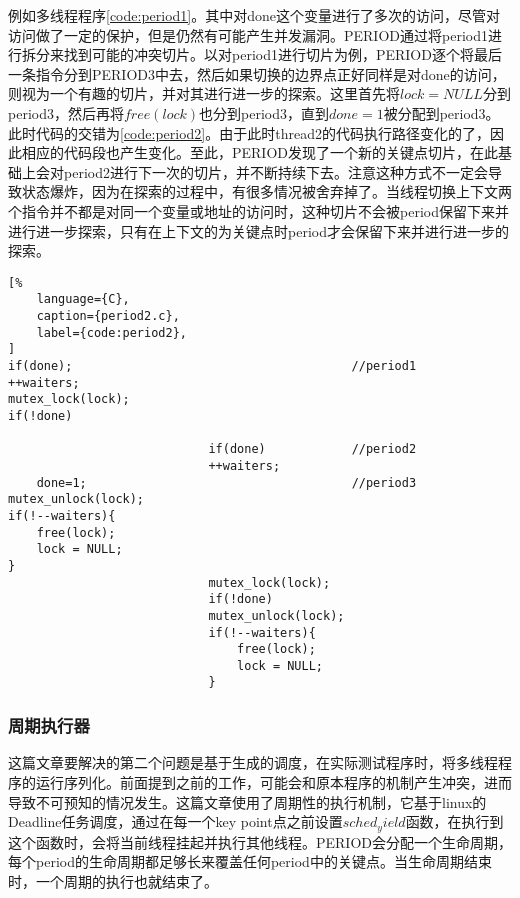 例如多线程程序\autoref{code:period1}。其中对done这个变量进行了多次的访问，尽管对访问做了一定的保护，但是仍然有可能产生并发漏洞。PERIOD通过将period1进行拆分来找到可能的冲突切片。以对period1进行切片为例，PERIOD逐个将最后一条指令分到PERIOD3中去，然后如果切换的边界点正好同样是对done的访问，则视为一个有趣的切片，并对其进行进一步的探索。这里首先将$lock = NULL$分到period3，然后再将$free(lock)$也分到period3，直到$done = 1$被分配到period3。此时代码的交错为\autoref{code:period2}。由于此时thread2的代码执行路径变化的了，因此相应的代码段也产生变化。至此，PERIOD发现了一个新的关键点切片，在此基础上会对period2进行下一次的切片，并不断持续下去。注意这种方式不一定会导致状态爆炸，因为在探索的过程中，有很多情况被舍弃掉了。当线程切换上下文两个指令并不都是对同一个变量或地址的访问时，这种切片不会被period保留下来并进行进一步探索，只有在上下文的为关键点时period才会保留下来并进行进一步的探索。

\begin{spacing}{1.0}
\begin{lstlisting}[%
    language={C},
    caption={period2.c},
    label={code:period2},
]
if(done);                                       //period1
++waiters;
mutex_lock(lock); 
if(!done) 

                            if(done)            //period2
                            ++waiters;
    done=1;                                     //period3
mutex_unlock(lock); 
if(!--waiters){ 
    free(lock); 
    lock = NULL; 
} 
                            mutex_lock(lock); 
                            if(!done)
                            mutex_unlock(lock);
                            if(!--waiters){ 
                                free(lock); 
                                lock = NULL; 
                            }
\end{lstlisting}
\end{spacing}

\subsubsection{周期执行器}

这篇文章要解决的第二个问题是基于生成的调度，在实际测试程序时，将多线程程序的运行序列化。前面提到之前的工作，可能会和原本程序的机制产生冲突，进而导致不可预知的情况发生。这篇文章使用了周期性的执行机制，它基于linux的Deadline任务调度，通过在每一个key point点之前设置$sched_yield$函数，在执行到这个函数时，会将当前线程挂起并执行其他线程。PERIOD会分配一个生命周期，每个period的生命周期都足够长来覆盖任何period中的关键点。当生命周期结束时，一个周期的执行也就结束了。

